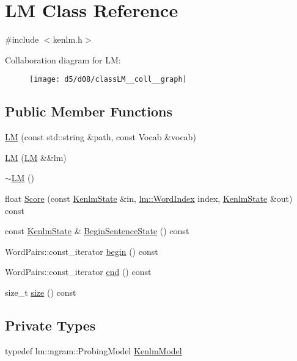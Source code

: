 \hypertarget{classLM}{}\section{LM Class Reference}
\label{classLM}


{\ttfamily \#include $<$kenlm.\+h$>$}



Collaboration diagram for LM\+:
\nopagebreak
\begin{figure}[H]
\begin{center}
\leavevmode
\texttt{[image: d5/d08/classLM\_\_coll\_\_graph]}
\end{center}
\end{figure}
\subsection*{Public Member Functions}
\begin{DoxyCompactItemize}
\item 
\hyperlink{classLM_a20c282226e69a993c382f33d2d73b06d}{LM} (const std\+::string \&path, const Vocab \&vocab)
\item 
\hyperlink{classLM_a48d4c54484feb8ae313ed1914c768f68}{LM} (\hyperlink{classLM}{LM} \&\&lm)
\item 
\hyperlink{classLM_ae515b0598a8be38144f5c031488b4c82}{$\sim$\+LM} ()
\item 
float \hyperlink{classLM_aefaa618805be0cdcfe1a358f5d6ed486}{Score} (const \hyperlink{kenlm_8h_ac0671733f284e84250e464637645ade4}{Kenlm\+State} \&in, \hyperlink{namespacelm_aea554f766016a7141535a9f8f648766a}{lm\+::\+Word\+Index} index, \hyperlink{kenlm_8h_ac0671733f284e84250e464637645ade4}{Kenlm\+State} \&out) const 
\item 
const \hyperlink{kenlm_8h_ac0671733f284e84250e464637645ade4}{Kenlm\+State} \& \hyperlink{classLM_aa9ddd84b61f439c6369f8daaff0f0244}{Begin\+Sentence\+State} () const 
\item 
Word\+Pairs\+::const\+\_\+iterator \hyperlink{classLM_a04fc742595c0ac2642e3b700d329af83}{begin} () const 
\item 
Word\+Pairs\+::const\+\_\+iterator \hyperlink{classLM_af4d8e463e48d56919efa04eb2a9dbc40}{end} () const 
\item 
size\+\_\+t \hyperlink{classLM_adee9e7617ec788bcf48ca57555aac428}{size} () const 
\end{DoxyCompactItemize}
\subsection*{Private Types}
\begin{DoxyCompactItemize}
\item 
typedef lm\+::ngram\+::\+Probing\+Model \hyperlink{classLM_adb71040d1b5532d2dcd258815f6f28b7}{Kenlm\+Model}
\end{DoxyCompactItemize}
